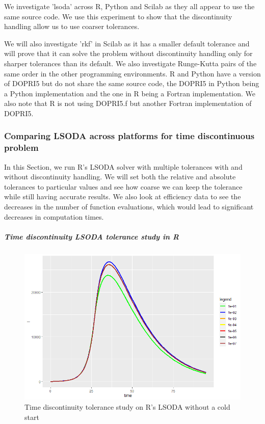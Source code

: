 We investigate 'lsoda' across R, Python and Scilab as they all appear to use the same source code. We use this experiment to show that the discontinuity handling allow us to use coarser tolerances.

We will also investigate 'rkf' in Scilab as it has a smaller default tolerance and will prove that it can solve the problem without discontinuity handling only for sharper tolerances than its default. We also investigate Runge-Kutta pairs of the same order in the other programming environments. R and Python have a version of DOPRI5 but do not share the same source code, the DOPRI5 in Python being a Python implementation and the one in R being a Fortran implementation. We also note that R is not using DOPRI5.f but another Fortran implementation of DOPRI5.

\subsubsection{Comparing LSODA across platforms for time discontinuous problem}

In this Section, we run R's LSODA solver with multiple tolerances with and without discontinuity handling. We will set both the relative and absolute tolerances to particular values and see how coarse we can keep the tolerance while still having accurate results. We also look at efficiency data to see the decreases in the number of function evaluations, which would lead to significant decreases in computation times.

\subparagraph{Time discontinuity LSODA tolerance study in R}
\begin{figure}[h]
	\centering
	\includegraphics[width=0.7\linewidth]{./figures/tolerance_time_lsoda_no_event_R}
	\caption{Time discontinuity tolerance study on R's LSODA without a cold start}
	\label{fig:tolerance_time_lsoda_no_event_R}
\end{figure}

